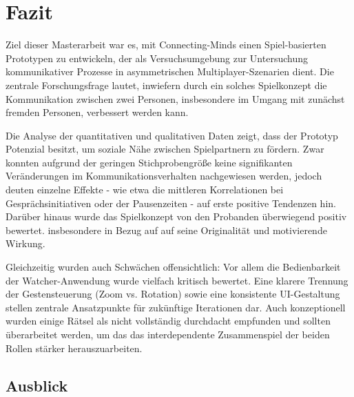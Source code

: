\chapter{Fazit}
Ziel dieser Masterarbeit war es, mit Connecting-Minds einen Spiel-basierten Prototypen zu entwickeln, der als Versuchsumgebung zur Untersuchung kommunikativer Prozesse in asymmetrischen Multiplayer-Szenarien dient. Die zentrale Forschungsfrage lautet, inwiefern durch ein solches Spielkonzept die Kommunikation zwischen zwei Personen, insbesondere im Umgang mit zunächst fremden Personen, verbessert werden kann.

Die Analyse der quantitativen und qualitativen Daten zeigt, dass der Prototyp Potenzial besitzt, um soziale Nähe zwischen Spielpartnern zu fördern. Zwar konnten aufgrund der geringen Stichprobengröße keine signifikanten Veränderungen im Kommunikationsverhalten nachgewiesen werden, jedoch deuten einzelne Effekte - wie etwa die mittleren Korrelationen bei Gesprächsinitiativen oder der Pausenzeiten - auf erste positive Tendenzen hin. Darüber hinaus wurde das Spielkonzept von den Probanden überwiegend positiv bewertet. insbesondere in Bezug auf auf seine Originalität und motivierende Wirkung.

Gleichzeitig wurden auch Schwächen offensichtlich: Vor allem die Bedienbarkeit der Watcher-Anwendung wurde vielfach kritisch bewertet. Eine klarere Trennung der Gestensteuerung (Zoom vs. Rotation) sowie eine konsistente UI-Gestaltung stellen zentrale Ansatzpunkte für zukünftige Iterationen dar. Auch konzeptionell wurden einige Rätsel als nicht vollständig durchdacht empfunden und sollten überarbeitet werden, um das das interdependente Zusammenspiel der beiden Rollen stärker herauszuarbeiten.

\section{Ausblick}\label{sec:prospect}


